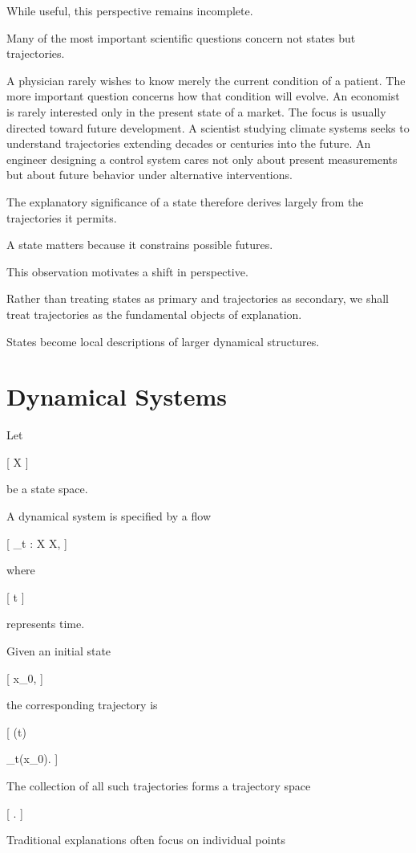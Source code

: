 \documentclass[11pt,oneside,openany]{book}
\begin{document}
While useful, this perspective remains incomplete.

Many of the most important scientific questions concern not states but trajectories.

A physician rarely wishes to know merely the current condition of a patient. The more important question concerns how that condition will evolve. An economist is rarely interested only in the present state of a market. The focus is usually directed toward future development. A scientist studying climate systems seeks to understand trajectories extending decades or centuries into the future. An engineer designing a control system cares not only about present measurements but about future behavior under alternative interventions.

The explanatory significance of a state therefore derives largely from the trajectories it permits.

A state matters because it constrains possible futures.

This observation motivates a shift in perspective.

Rather than treating states as primary and trajectories as secondary, we shall treat trajectories as the fundamental objects of explanation.

States become local descriptions of larger dynamical structures.

\section{Dynamical Systems}

Let

[
\mathcal X
]

be a state space.

A dynamical system is specified by a flow

[
\Phi_t
:
\mathcal X
\rightarrow
\mathcal X,
]

where

[
t
]

represents time.

Given an initial state

[
x_0,
]

the corresponding trajectory is

[
\gamma(t)

\Phi_t(x_0).
]

The collection of all such trajectories forms a trajectory space

[
\Gamma.
]

Traditional explanations often focus on individual points
\end{document}
